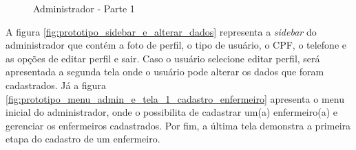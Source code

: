 \begin{figure}[H]
    \centering
    \caption{Administrador - Parte 1}
\end{figure}

A figura \ref{fig:prototipo_sidebar_e_alterar_dados} representa a \textit{sidebar} do administrador que contém a foto de perfil, o tipo de usuário, o CPF, o telefone e as opções de editar perfil e sair. Caso o usuário selecione editar perfil, será apresentada a segunda tela onde o usuário pode alterar os dados que foram cadastrados. Já a figura \ref{fig:prototipo_menu_admin_e_tela_1_cadastro_enfermeiro} apresenta o menu inicial do administrador, onde o possibilita de cadastrar um(a) enfermeiro(a) e gerenciar os enfermeiros cadastrados. Por fim, a última tela demonstra a primeira etapa do cadastro de um enfermeiro.

\begin{figure}[H]
    \centering
\end{figure}

